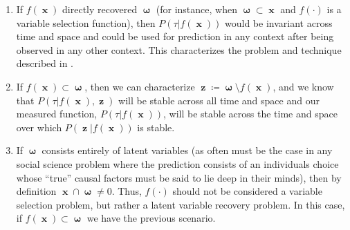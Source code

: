 \documentclass[a4paper,12pt]{article}
\DeclareMathOperator*{\om}{\mathbf{\omega}}
\DeclareMathOperator*{\x}{\mathbf{x}}
\DeclareMathOperator*{\z}{\mathbf{z}}
\begin{document}
\begin{enumerate}
\item If $f(\x)$ directly recovered $\om$ (for instance, when $\om \subset \x$ and $f(\cdot)$ is a variable selection function), then $P(\tau | f(\x))$ would be invariant across time and space and could be used for prediction in any context after being observed in any other context. This characterizes the problem and technique described in \cite{Rojas-carulla2018}.

\item If $f(\x) \subset \om$, then we can characterize $\z \coloneqq \om \setminus f(\x)$, and we know that $P(\tau | f(\x), \z )$ will be stable across all time and space and our measured function, $P(\tau | f(\x) )$, will be stable across the time and space over which $P( \z | f(\x))$ is stable.

\item If $\om$ consists entirely of latent variables (as often must be the case in any social science problem where the prediction consists of an individuals choice whose ``true'' causal factors must be said to lie deep in their minds), then by definition $\x \cap \om \neq 0$. Thus, $f(\cdot)$ should not be considered a variable selection problem, but rather a latent variable recovery problem. In this case, if $f(\x) \subset \om$ we have the previous scenario.



\end{enumerate}




\end{document}
